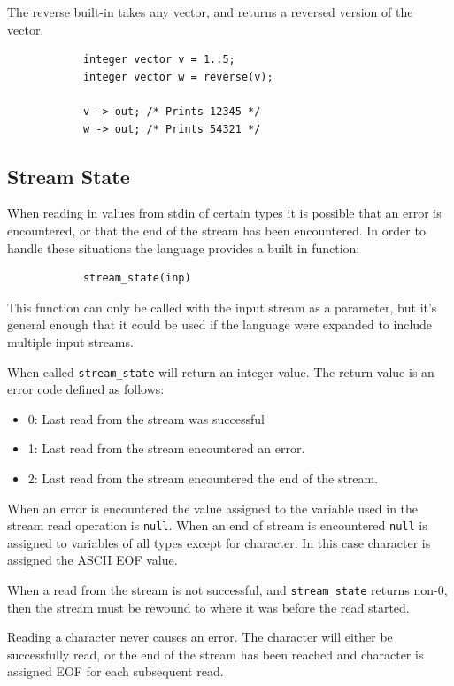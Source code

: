 \documentclass{article}
\begin{document}
		The reverse built-in takes any vector, and returns a reversed version of the vector.

		\begin{lstlisting}
			integer vector v = 1..5;
			integer vector w = reverse(v);

			v -> out; /* Prints 12345 */
			w -> out; /* Prints 54321 */
		\end{lstlisting}

	\subsection{Stream State}\label{sec:streamState}
		When reading in values from stdin of certain types it is possible that an error is encountered, or that the end
		of the stream has been encountered. In order to handle these situations the language provides a built in
		function:

		\begin{lstlisting}
			stream_state(inp)
		\end{lstlisting}

		This function can only be called with the input stream as a parameter, but it's general enough that it could be
		used if the language were expanded to include multiple input streams.

		When called \texttt{stream\_state} will return an integer value. The return value is an error code defined as
		follows:

		\begin{itemize}
			\item 0: Last read from the stream was successful
			\item 1: Last read from the stream encountered an error.
			\item 2: Last read from the stream encountered the end of the stream.
		\end{itemize}

		When an error is encountered the value assigned to the variable used in the stream read operation is
		\texttt{null}. When an end of stream is encountered \texttt{null} is assigned to variables of all types except
		for character. In this case character is assigned the ASCII EOF value.

		When a read from the stream is not successful, and \texttt{stream\_state} returns non-0, then the stream must be
		rewound to where it was before the read started.

		Reading a character never causes an error. The character will either be successfully read, or the end of the
		stream has been reached and character is assigned EOF for each subsequent read.
\end{document}
